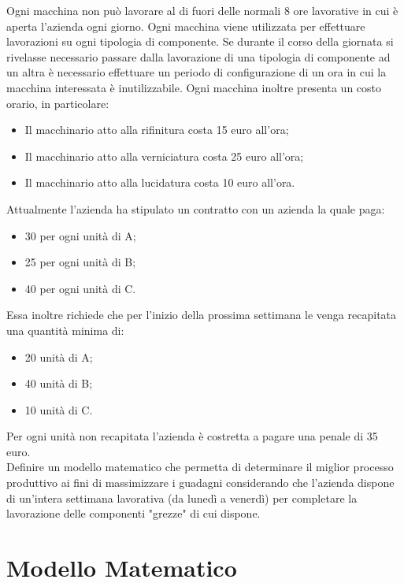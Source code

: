 \documentclass[12pt]{article}
\begin{document}
	Ogni macchina non può lavorare al di fuori delle normali 8 ore lavorative in cui è aperta l'azienda ogni giorno.
	Ogni macchina viene utilizzata per effettuare lavorazioni su ogni tipologia di componente. Se durante il corso della giornata si rivelasse necessario passare dalla lavorazione di una tipologia di componente ad un altra è necessario effettuare un periodo di configurazione di un ora in cui la macchina interessata è inutilizzabile.
	Ogni macchina inoltre presenta un costo orario, in particolare:
	\begin{itemize}
		\item Il macchinario atto alla rifinitura costa 15 euro all'ora;
		\item Il macchinario atto alla verniciatura costa 25 euro all'ora;
		\item Il macchinario atto alla lucidatura costa 10 euro all'ora.
	\end{itemize}
	Attualmente l'azienda ha stipulato un contratto con un azienda la quale paga:
	\begin{itemize}
		\item 30 per ogni unità di A;
		\item 25 per ogni unità di B;
		\item 40 per ogni unità di C.		
	\end{itemize}
	Essa inoltre richiede che per l'inizio della prossima settimana le venga recapitata una quantità minima di:
	\begin{itemize}
		\item 20 unità di A;
		\item 40 unità di B;
		\item 10 unità di C.
	\end{itemize}
	Per ogni unità non recapitata l'azienda è costretta a pagare una penale di 35 euro.\\
	Definire un modello matematico che permetta di determinare il miglior processo produttivo ai fini di massimizzare i guadagni considerando che l'azienda dispone di un'intera settimana lavorativa (da lunedì a venerdì) per completare la lavorazione delle componenti "grezze" di cui dispone.
	\pagebreak
	\section{Modello Matematico}
\end{document}
